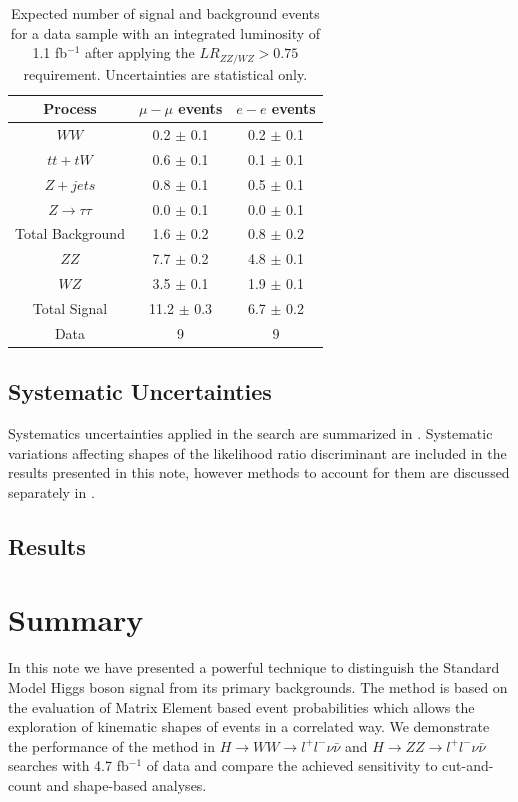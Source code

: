 \documentclass{cmspaper}
\begin{document}
\begin{table}[!hbtp]
  \begin{center}
  \begin{tabular} {c|c|c}
 \hline
  Process & $\mu-\mu$ events  & $e-e$ events \\
  \hline
  \hline
  $WW$                  &  0.2 $\pm$  0.1 &  0.2 $\pm$   0.1 \\
  $tt + tW$             &  0.6 $\pm$  0.1 &  0.1 $\pm$   0.1 \\
  $Z  + jets$           &  0.8 $\pm$  0.1 &  0.5 $\pm$   0.1\\
  $Z\rightarrow \tau\tau$& 0.0 $\pm$  0.1 &  0.0 $\pm$   0.1\\
  \hline
  Total Background      &  1.6 $\pm$  0.2 &  0.8 $\pm$   0.2\\
  \hline
  $ZZ$                  &  7.7 $\pm$  0.2 &  4.8 $\pm$   0.1\\
  $WZ$                  &  3.5  $\pm$ 0.1 &  1.9 $\pm$   0.1\\
 \hline
  Total Signal          &  11.2 $\pm$ 0.3 &  6.7 $\pm$   0.2\\
 \hline
  Data                  &  9               &   9              \\
 \hline
  \end{tabular}

  \caption{Expected number of signal and background events for a data sample with an 
  integrated luminosity of 1.1 fb$^{-1}$ after applying the $LR_{ZZ/WZ}>0.75$ requirement. 
 Uncertainties are statistical only.}
   \label{tab:ZZWZselection}
  \end{center}
\end{table}

\subsection{Systematic Uncertainties}
Systematics uncertainties applied in the search are summarized in \cite{ref:HZZ2011smurf}.
Systematic variations affecting shapes of the likelihood ratio discriminant are included in the results presented in this note,
however methods to account for them are discussed separately in \cite{ref:ShapeSmurf}. 

\subsection{Results}
\label{sec:results_hzz}



\section{Summary}
In this note we have presented a powerful technique to distinguish the Standard Model Higgs boson signal
from its primary backgrounds. The method is based on the evaluation of Matrix Element based event probabilities 
which allows the exploration of kinematic shapes of events in a correlated way. We demonstrate the
performance of the method in $H \rightarrow WW \rightarrow l^{+}l^{-}\nu\bar{\nu}$ and $H \rightarrow ZZ \rightarrow l^{+}l^{-}\nu\bar{\nu}$ searches with 4.7 fb$^{-1}$ of data and compare the achieved sensitivity to cut-and-count and shape-based analyses.  
\end{document}
